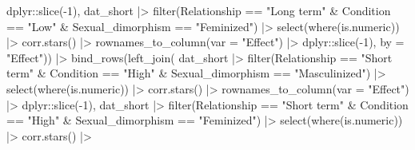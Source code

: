 \documentclass[
  bookmarksnumbered]{article}
\newenvironment{Shaded}{\begin{snugshade}}{\end{snugshade}}
\newcommand{\AttributeTok}[1]{\textcolor[rgb]{0.80,0.80,0.80}{#1}}
\newcommand{\DecValTok}[1]{\textcolor[rgb]{0.86,0.86,0.80}{#1}}
\newcommand{\FunctionTok}[1]{\textcolor[rgb]{0.94,0.94,0.56}{#1}}
\newcommand{\NormalTok}[1]{\textcolor[rgb]{0.80,0.80,0.80}{#1}}
\newcommand{\SpecialCharTok}[1]{\textcolor[rgb]{0.86,0.64,0.64}{#1}}
\newcommand{\StringTok}[1]{\textcolor[rgb]{0.80,0.58,0.58}{#1}}
\begin{document}
\begin{Shaded}
\begin{Highlighting}[]
\NormalTok{      dplyr}\SpecialCharTok{::}\FunctionTok{slice}\NormalTok{(}\SpecialCharTok{{-}}\DecValTok{1}\NormalTok{),}
\NormalTok{    dat\_short }\SpecialCharTok{|\textgreater{}}
      \FunctionTok{filter}\NormalTok{(Relationship }\SpecialCharTok{==} \StringTok{"Long term"} \SpecialCharTok{\&}
\NormalTok{               Condition }\SpecialCharTok{==} \StringTok{"Low"} \SpecialCharTok{\&} 
\NormalTok{               Sexual\_dimorphism }\SpecialCharTok{==} \StringTok{"Feminized"}\NormalTok{) }\SpecialCharTok{|\textgreater{}}
      \FunctionTok{select}\NormalTok{(}\FunctionTok{where}\NormalTok{(is.numeric)) }\SpecialCharTok{|\textgreater{}} 
      \FunctionTok{corr.stars}\NormalTok{() }\SpecialCharTok{|\textgreater{}}
      \FunctionTok{rownames\_to\_column}\NormalTok{(}\AttributeTok{var =} \StringTok{"Effect"}\NormalTok{) }\SpecialCharTok{|\textgreater{}} 
\NormalTok{      dplyr}\SpecialCharTok{::}\FunctionTok{slice}\NormalTok{(}\SpecialCharTok{{-}}\DecValTok{1}\NormalTok{),}
    \AttributeTok{by =} \StringTok{"Effect"}\NormalTok{)) }\SpecialCharTok{|\textgreater{}} 
  \FunctionTok{bind\_rows}\NormalTok{(}\FunctionTok{left\_join}\NormalTok{(}
\NormalTok{    dat\_short }\SpecialCharTok{|\textgreater{}}
      \FunctionTok{filter}\NormalTok{(Relationship }\SpecialCharTok{==} \StringTok{"Short term"} \SpecialCharTok{\&}
\NormalTok{               Condition }\SpecialCharTok{==} \StringTok{"High"} \SpecialCharTok{\&} 
\NormalTok{               Sexual\_dimorphism }\SpecialCharTok{==} \StringTok{"Masculinized"}\NormalTok{) }\SpecialCharTok{|\textgreater{}}
      \FunctionTok{select}\NormalTok{(}\FunctionTok{where}\NormalTok{(is.numeric)) }\SpecialCharTok{|\textgreater{}} 
      \FunctionTok{corr.stars}\NormalTok{() }\SpecialCharTok{|\textgreater{}}
      \FunctionTok{rownames\_to\_column}\NormalTok{(}\AttributeTok{var =} \StringTok{"Effect"}\NormalTok{) }\SpecialCharTok{|\textgreater{}} 
\NormalTok{      dplyr}\SpecialCharTok{::}\FunctionTok{slice}\NormalTok{(}\SpecialCharTok{{-}}\DecValTok{1}\NormalTok{),}
\NormalTok{    dat\_short }\SpecialCharTok{|\textgreater{}}
      \FunctionTok{filter}\NormalTok{(Relationship }\SpecialCharTok{==} \StringTok{"Short term"} \SpecialCharTok{\&}
\NormalTok{               Condition }\SpecialCharTok{==} \StringTok{"High"} \SpecialCharTok{\&} 
\NormalTok{               Sexual\_dimorphism }\SpecialCharTok{==} \StringTok{"Feminized"}\NormalTok{) }\SpecialCharTok{|\textgreater{}}
      \FunctionTok{select}\NormalTok{(}\FunctionTok{where}\NormalTok{(is.numeric)) }\SpecialCharTok{|\textgreater{}} 
      \FunctionTok{corr.stars}\NormalTok{() }\SpecialCharTok{|\textgreater{}}

\end{Highlighting}
\end{Shaded}
\end{document}
